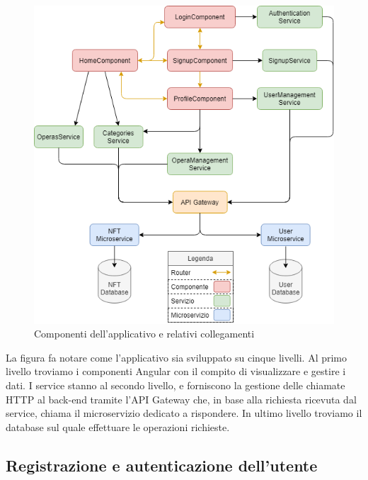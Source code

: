 \documentclass[11pt]{article}
\begin{document}
\newpage

\begin{figure}[!htb]
\centering
	\includegraphics[width=17cm]{Images/progettazione}
	\caption{Componenti dell'applicativo e relativi collegamenti}
\end{figure}


La figura fa notare come l’applicativo sia sviluppato su cinque livelli. Al primo livello troviamo i componenti Angular con il compito di visualizzare e gestire i dati. I service stanno al secondo livello, e forniscono la gestione delle chiamate HTTP al back-end tramite l’API Gateway che, in base alla richiesta ricevuta dal service, chiama il microservizio dedicato a rispondere. In ultimo livello troviamo il database sul quale effettuare le operazioni richieste.

\newpage

\subsection{Registrazione e autenticazione dell'utente}
\end{document}
